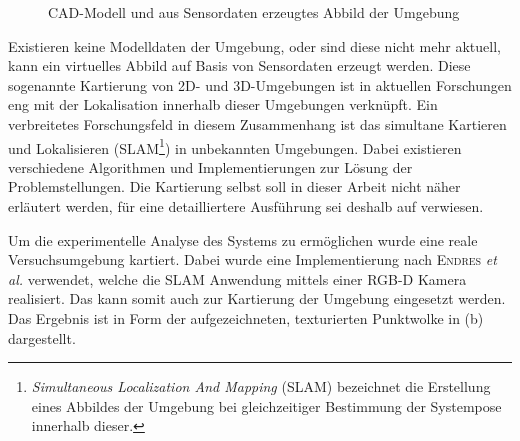 
\begin{figure}[ht]
	\begin{center}
		\hspace{5mm}
		\caption{CAD-Modell und aus Sensordaten erzeugtes Abbild der Umgebung}
		\label{fig.mapCADSLAM}
	\end{center}
\end{figure}

Existieren keine Modelldaten der Umgebung, oder sind diese nicht mehr aktuell, kann ein virtuelles Abbild auf Basis von Sensordaten erzeugt werden. Diese sogenannte Kartierung von 2D- und 3D-Umgebungen ist in aktuellen Forschungen eng mit der Lokalisation innerhalb dieser Umgebungen verknüpft. Ein verbreitetes Forschungsfeld in diesem Zusammenhang ist das simultane Kartieren und Lokalisieren (SLAM\footnote{\textit{Simultaneous Localization And Mapping} (SLAM) bezeichnet die Erstellung eines Abbildes der Umgebung bei gleichzeitiger Bestimmung der Systempose innerhalb dieser.}) in unbekannten Umgebungen. Dabei existieren verschiedene Algorithmen und Implementierungen zur Lösung der Problemstellungen. Die Kartierung selbst soll in dieser Arbeit nicht näher erläutert werden, für eine detailliertere Ausführung sei deshalb auf \cite{Durrant2006} verwiesen.\\


Um die experimentelle Analyse des Systems zu ermöglichen wurde eine reale Versuchsumgebung kartiert. Dabei wurde eine Implementierung \cite{Rgbdslam} nach \textsc{Endres} \textit{et al.} \cite{Endres2014} verwendet, welche die SLAM Anwendung mittels einer RGB-D Kamera realisiert. Das \kps{} kann somit auch zur Kartierung der Umgebung eingesetzt werden. Das Ergebnis ist in Form der aufgezeichneten, texturierten Punktwolke in  (b) dargestellt.\\


